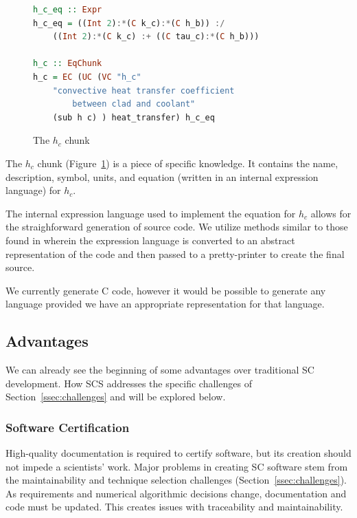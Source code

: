 \documentclass{sig-alternate-05-2015}
\newcommand{\lss}{SCS}
\begin{document}
\begin{figure}
\begin{lstlisting}[language=Haskell, frame=single, showstringspaces=false, basicstyle=\small]
h_c_eq :: Expr
h_c_eq = ((Int 2):*(C k_c):*(C h_b)) :/ 
    ((Int 2):*(C k_c) :+ ((C tau_c):*(C h_b)))

h_c :: EqChunk
h_c = EC (UC (VC "h_c" 
    "convective heat transfer coefficient 
        between clad and coolant"
    (sub h c) ) heat_transfer) h_c_eq
\end{lstlisting}
\caption{The $h_c$ chunk}
\label{fig:know_specific}
\end{figure}

The $h_c$ chunk (Figure~\ref{fig:know_specific}) is a piece of specific
knowledge. It contains the name, description, symbol, units, and equation
(written in an internal expression language) for $h_c$.

The internal expression language used to implement the equation for $h_c$
allows for the straighforward generation of source code. We utilize methods
similar to those found in \cite{Carette???, Szymczak???}
wherein the expression language is converted to an abstract representation of
the code and then passed to a pretty-printer to create the final source.

We currently generate C code, however it would be possible to generate any
language provided we have an appropriate representation for that language.
\subsection{Advantages} \label{ssec:advantages}

We can already see the beginning of some advantages over traditional SC
development. How \lss{} addresses the specific challenges of
Section~\ref{ssec:challenges} and will be explored below.

\subsubsection{Software Certification} \label{sssec:adv_cert}

High-quality documentation is required to certify software, but its creation
should not impede a scientists' work.  Major problems in creating SC software
stem from the maintainability and technique selection challenges
(Section~\ref{ssec:challenges}). As requirements and numerical algorithmic
decisions change, documentation and code must be updated.  This creates issues
with traceability and maintainability.
\end{document}
